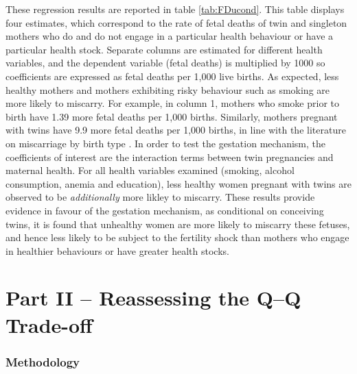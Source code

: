 \documentclass[subeqn]{article}
\begin{document}
\begin{spacing}{1.4}
These regression results are reported in table \ref{tab:FDucond}.  This table
displays four estimates, which correspond to the rate of fetal deaths of twin
and singleton mothers who do and do not engage in a particular health behaviour
or have a particular health stock.  Separate columns are estimated for different
health variables, and the dependent variable (fetal deaths) is multiplied by 1000
so coefficients are expressed as fetal deaths per 1,000 live births. As expected,
less healthy mothers and mothers exhibiting risky behaviour such as smoking are
more likely to miscarry.  For example, in column 1, mothers who smoke prior to
birth have 1.39 more fetal deaths per 1,000 births.  Similarly, mothers pregnant
with twins have 9.9 more fetal deaths per 1,000 births, in line with the
literature on miscarriage by birth type \citep{Garciaetal2002}.  In order to
test the gestation mechanism, the coefficients of interest are the interaction
terms between twin pregnancies and maternal health.  For all health variables 
examined (smoking, alcohol consumption, anemia and education), less healthy women
pregnant with twins are observed to be \emph{additionally} more likley to
miscarry. These results provide evidence in favour of the gestation mechanism,
as conditional on conceiving twins, it is found that unhealthy women are more 
likely to miscarry these fetuses, and hence less likely to be subject to the
fertility shock than mothers who engage in healthier behaviours or have greater
health stocks.

\setcounter{section}{0}
\part*{Part II -- Reassessing the Q--Q Trade-off}
\section{Methodology}
\label{TWINscn:method}

\end{spacing}
\end{document}
